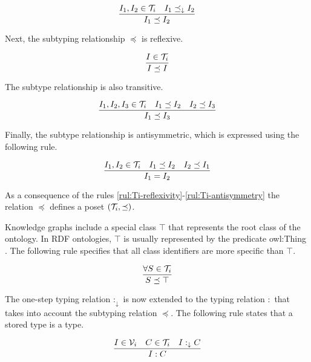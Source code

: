 \documentclass[runningheads]{llncs}
\newcommand{\darr}{\downarrow}
\newcommand{\V}{{\cal V}}
\newcommand{\T}{{\cal T}}
\begin{document}
\begin{equation}
\label{rul:Ic-extended}
\dfrac{I_1,I_2\in\T_i \quad I_1\preceq_\darr\/I_2}
      {I_1 \preceq I_2}
\end{equation}

Next, the subtyping relationship $\preceq$ is reflexive.

\begin{equation}
\label{rul:Ti-reflexivity}
\dfrac{I\in\T_i}
      {I\preceq\/I}
\end{equation}

The subtype relationship is also transitive. 

\begin{equation}
\label{rul:Ti-transitivity}
\dfrac{I_1,I_2,I_3\in\T_i\quad\/I_1\preceq\/I_2\quad\/I_2\preceq\/I_3}
      {I_1\preceq\/I_3}   
\end{equation}

Finally, the subtype relationship is antisymmetric, which is expressed
using the following rule.

\begin{equation}
\label{rul:Ti-antisymmetry}
\dfrac{I_1,I_2\in\T_i \quad I_1\preceq\/I_2 \quad I_2\preceq\/I_1}
      {I_1=I_2}   
\end{equation}

As a consequence of the rules
\ref{rul:Ti-reflexivity}-\ref{rul:Ti-antisymmetry} the relation
$\preceq$ defines a poset $(\T_i,\preceq)$.

Knowledge graphs include a special class $\top$ that represents the
root class of the ontology. In RDF ontologies, $\top$ is usually
represented by the predicate owl:Thing \cite{Hoffart2013}. The
following rule specifies that all class identifiers are more specific
than $\top$.

\begin{equation}
\dfrac{\forall\/S\in\T_i}
      {S\preceq\top}
\end{equation}

The one-step typing relation $:_\darr$ is now extended to the typing
relation $:$ that takes into account the subtyping relation $\preceq$.
The following rule states that a stored type is a type.

\begin{equation}
\dfrac{I\in\V_i\quad\/C\in\T_i\quad\/I:_\darr\/C}
      {I:C}
\end{equation}
\end{document}
